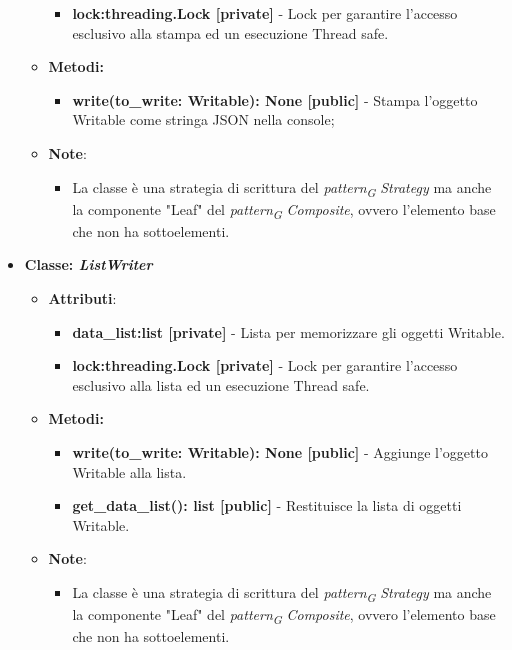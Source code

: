 \begin{itemize}
\begin{itemize}
\begin{itemize}
        \item \textbf{lock:threading.Lock [private]} - Lock per garantire l'accesso esclusivo alla stampa ed un esecuzione Thread safe.
    \end{itemize}
    \item \textbf{Metodi: }
    \begin{itemize}
        \item \textbf{write(to\_write: Writable): None [public]} - Stampa l'oggetto Writable come stringa JSON nella console;
    \end{itemize}
    \item\textbf{Note}:
        \begin{itemize}
            \item La classe è una strategia di scrittura del \textit{pattern}\textsubscript{\textit{G}} \textit{Strategy} ma anche la componente "Leaf" del \textit{pattern}\textsubscript{\textit{G}} \textit{Composite}, ovvero l'elemento base che non ha sottoelementi.
        \end{itemize}
    \end{itemize}
    \item{\textbf{Classe: \textit{ListWriter}}}
    \begin{itemize}
    \item\textbf{Attributi}:
        \begin{itemize}
        \item \textbf{data\_list:list [private]} - Lista per memorizzare gli oggetti Writable.
        \item \textbf{lock:threading.Lock [private]} - Lock per garantire l'accesso esclusivo alla lista ed un esecuzione Thread safe.
    \end{itemize}
    \item \textbf{Metodi: }
    \begin{itemize}
        \item \textbf{write(to\_write: Writable): None [public]} - Aggiunge l'oggetto Writable alla lista.
        \item \textbf{get\_data\_list(): list [public]} - Restituisce la lista di oggetti Writable.
    \end{itemize}
    \item\textbf{Note}:
        \begin{itemize}
            \item La classe è una strategia di scrittura del \textit{pattern}\textsubscript{\textit{G}} \textit{Strategy} ma anche la componente "Leaf" del \textit{pattern}\textsubscript{\textit{G}} \textit{Composite}, ovvero l'elemento base che non ha sottoelementi.

\end{itemize}
\end{itemize}
\end{itemize}
